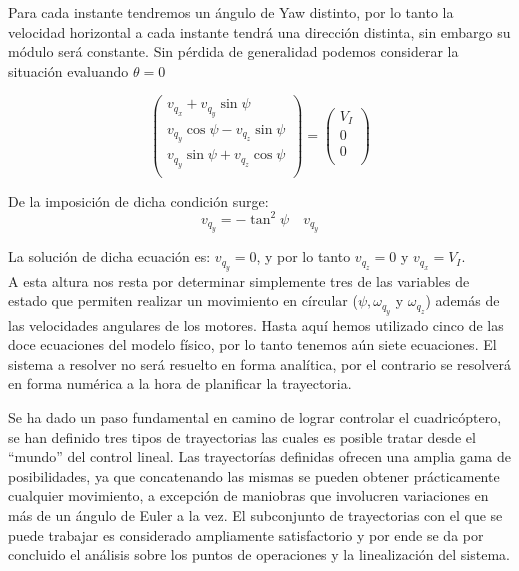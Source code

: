 \documentclass[main]{subfiles}
\begin{document}
Para cada instante tendremos un \'angulo de Yaw distinto, por lo tanto la velocidad horizontal a cada instante tendr\'a una direcci\'on distinta, sin embargo su m\'odulo ser\'a constante. Sin p\'erdida de generalidad podemos considerar la situaci\'on evaluando $\theta = 0$

\begin{equation}
\label{eq:vel_theta}
\left(\begin{array}{c}
v_{q_x}+v_{q_y}\sin\psi\\
v_{q_y}\cos\psi-v_{q_z}\sin\psi\\
v_{q_y}\sin\psi+v_{q_z}\cos\psi\\
\end{array}\right)=\left(\begin{array}{c}
V_{I}\\
0\\
0\\
\end{array}\right)
\end{equation}	

De la imposici\'on de dicha condici\'on surge:
\begin{equation}
v_{q_y} = - \tan^2\psi \quad v_{q_y}
\end{equation}

La soluci\'on de dicha ecuaci\'on es: $v_{q_y} = 0$, y por lo tanto $v_{q_z} = 0$ y $v_{q_x} = V_I$.\\

A esta altura nos resta por determinar simplemente tres de las variables de estado que permiten realizar un movimiento en c\'ircular ($\psi, \omega_{q_y}$ y $\omega_{q_z}$) adem\'as de las velocidades angulares de los motores. Hasta aqu\'i hemos utilizado cinco de las doce ecuaciones del modelo f\'isico, por lo tanto tenemos a\'un siete ecuaciones. El sistema a resolver no ser\'a resuelto en forma anal\'itica, por el contrario se resolver\'a en forma num\'erica a la hora de planificar la trayectoria. 


Se ha dado un paso fundamental en camino de lograr controlar el cuadric\'optero, se han definido tres tipos de trayectorias las cuales es posible tratar desde el ``mundo'' del control lineal. Las trayector\'ias definidas ofrecen una amplia gama de posibilidades, ya que concatenando las mismas se pueden obtener pr\'acticamente cualquier movimiento, a excepci\'on de maniobras que involucren variaciones en m\'as de un \'angulo de Euler a la vez. El subconjunto de trayectorias con el que se puede trabajar es considerado ampliamente satisfactorio y por ende se da por concluido el an\'alisis sobre los puntos de operaciones y la linealizaci\'on del sistema. 
\end{document}
